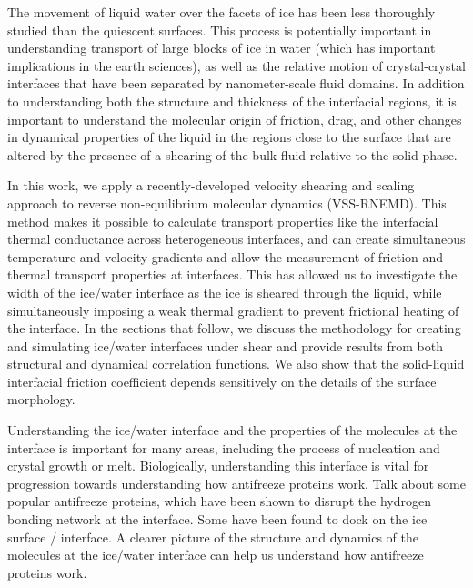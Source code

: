 The movement of liquid water over the facets of ice has been less
thoroughly studied than the quiescent surfaces. This process is
potentially important in understanding transport of large blocks of
ice in water (which has important implications in the earth sciences),
as well as the relative motion of crystal-crystal interfaces that have
been separated by nanometer-scale fluid domains.  In addition to
understanding both the structure and thickness of the interfacial
regions, it is important to understand the molecular origin of
friction, drag, and other changes in dynamical properties of the
liquid in the regions close to the surface that are altered by the
presence of a shearing of the bulk fluid relative to the solid phase.

In this work, we apply a recently-developed velocity shearing and
scaling approach to reverse non-equilibrium molecular dynamics
(VSS-RNEMD). This method makes it possible to calculate transport
properties like the interfacial thermal conductance across
heterogeneous interfaces,\cite{Kuang2012} and can create simultaneous
temperature and velocity gradients and allow the measurement of
friction and thermal transport properties at interfaces.  This has
allowed us to investigate the width of the ice/water interface as the
ice is sheared through the liquid, while simultaneously imposing a
weak thermal gradient to prevent frictional heating of the interface.
In the sections that follow, we discuss the methodology for creating
and simulating ice/water interfaces under shear and provide results
from both structural and dynamical correlation functions.  We also
show that the solid-liquid interfacial friction coefficient depends
sensitively on the details of the surface morphology.


Understanding the ice/water interface and the properties of the
molecules at the interface is important for many areas, including the
process of nucleation and crystal growth or melt. Biologically,
understanding this interface is vital for progression towards
understanding how antifreeze proteins work. Talk about some popular
antifreeze proteins, which have been shown to disrupt the hydrogen
bonding network at the interface. Some have been found to dock on the
ice surface / interface. A clearer picture of the structure and
dynamics of the molecules at the ice/water interface can help us
understand how antifreeze proteins work.

